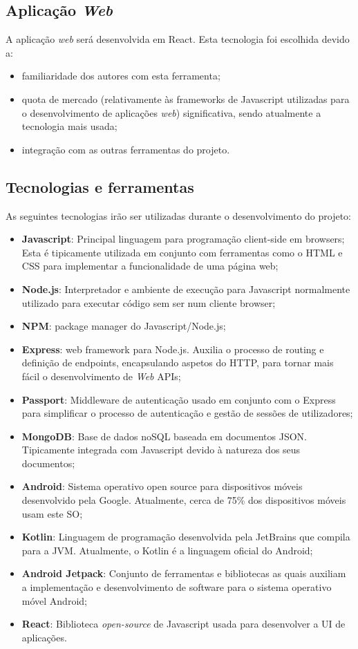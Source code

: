 \subsection{Aplicação \textit{Web}}
A aplicação \textit{web} será desenvolvida em React. Esta tecnologia foi escolhida devido a:

\begin{itemize}
	\item familiaridade dos autores com esta ferramenta;
	\item quota de mercado (relativamente às frameworks de Javascript utilizadas para o desenvolvimento de aplicações \textit{web}) significativa, sendo atualmente a tecnologia mais usada;
	\item integração com as outras ferramentas do projeto.
\end{itemize}

\subsection{Tecnologias e ferramentas}
As seguintes tecnologias irão ser utilizadas durante o desenvolvimento do projeto:
\begin{itemize}
	\item \textbf{Javascript}: Principal linguagem para programação client-side em browsers; Esta é tipicamente utilizada em conjunto com ferramentas como o HTML e CSS para implementar a funcionalidade de uma página web;
	\item \textbf{Node.js}: Interpretador e ambiente de execução para Javascript normalmente utilizado para executar código sem ser num cliente browser;
	\item \textbf{NPM}: package manager do Javascript/Node.js;
	\item \textbf{Express}: web framework para Node.js. Auxilia o processo de routing e definição de endpoints, encapsulando aspetos do HTTP, para tornar mais fácil o desenvolvimento de \textit{Web} APIs;
	\item \textbf{Passport}: Middleware de autenticação usado em conjunto com o Express para simplificar o processo de autenticação e gestão de sessões de utilizadores;
	\item \textbf{MongoDB}: Base de dados noSQL baseada em documentos JSON. Tipicamente integrada com Javascript devido à natureza dos seus documentos;
	\item \textbf{Android}: Sistema operativo open source para dispositivos móveis desenvolvido pela Google. Atualmente, cerca de 75\% dos dispositivos móveis usam este SO;
	\item \textbf{Kotlin}: Linguagem de programação desenvolvida pela JetBrains que compila para a JVM. Atualmente, o Kotlin é a linguagem oficial do Android;
	\item \textbf{Android Jetpack}: Conjunto de ferramentas e bibliotecas as quais auxiliam a implementação e desenvolvimento de software para o sistema operativo móvel Android;
	\item \textbf{React}: Biblioteca \textit{open-source} de Javascript usada para desenvolver a UI de aplicações.
\end{itemize}
